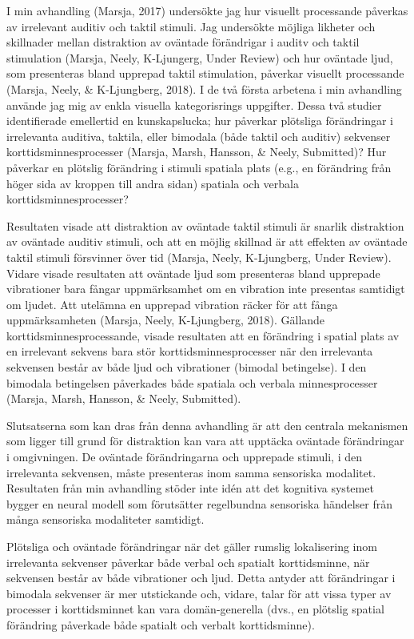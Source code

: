 \documentclass[]{article}
\begin{document}
I min avhandling (Marsja, 2017) undersökte jag hur visuellt processande
påverkas av irrelevant auditiv och taktil stimuli. Jag undersökte
möjliga likheter och skillnader mellan distraktion av oväntade
förändrigar i auditv och taktil stimulation (Marsja, Neely, K-Ljungerg,
Under Review) och hur oväntade ljud, som presenteras bland upprepad
taktil stimulation, påverkar visuellt processande (Marsja, Neely, \&
K-Ljungberg, 2018). I de två första arbetena i min avhandling använde
jag mig av enkla visuella kategorisrings uppgifter. Dessa två studier
identifierade emellertid en kunskapslucka; hur påverkar plötsliga
förändringar i irrelevanta auditiva, taktila, eller bimodala (både
taktil och auditiv) sekvenser korttidsminnesprocesser (Marsja, Marsh,
Hansson, \& Neely, Submitted)? Hur påverkar en plötslig förändring i
stimuli spatiala plats (e.g., en förändring från höger sida av kroppen
till andra sidan) spatiala och verbala korttidsminnesprocesser?

Resultaten visade att distraktion av oväntade taktil stimuli är snarlik
distraktion av oväntade auditiv stimuli, och att en möjlig skillnad är
att effekten av oväntade taktil stimuli försvinner över tid (Marsja,
Neely, K-Ljungberg, Under Review). Vidare visade resultaten att oväntade
ljud som presenteras bland upprepade vibrationer bara fångar
uppmärksamhet om en vibration inte presentas samtidigt om ljudet. Att
utelämna en upprepad vibration räcker för att fånga uppmärksamheten
(Marsja, Neely, K-Ljungberg, 2018). Gällande korttidsminnesprocessande,
visade resultaten att en förändring i spatial plats av en irrelevant
sekvens bara stör korttidsminnesprocesser när den irrelevanta sekvensen
består av både ljud och vibrationer (bimodal betingelse). I den bimodala
betingelsen påverkades både spatiala och verbala minnesprocesser
(Marsja, Marsh, Hansson, \& Neely, Submitted).

Slutsatserna som kan dras från denna avhandling är att den centrala
mekanismen som ligger till grund för distraktion kan vara att upptäcka
oväntade förändringar i omgivningen. De oväntade förändringarna och
upprepade stimuli, i den irrelevanta sekvensen, måste presenteras inom
samma sensoriska modalitet. Resultaten från min avhandling stöder inte
idén att det kognitiva systemet bygger en neural modell som förutsätter
regelbundna sensoriska händelser från många sensoriska modaliteter
samtidigt.

Plötsliga och oväntade förändringar när det gäller rumslig lokalisering
inom irrelevanta sekvenser påverkar både verbal och spatialt
korttidsminne, när sekvensen består av både vibrationer och ljud. Detta
antyder att förändringar i bimodala sekvenser är mer utstickande och,
vidare, talar för att vissa typer av processer i korttidsminnet kan vara
domän-generella (dvs., en plötslig spatial förändring påverkade både
spatialt och verbalt korttidsminne).
\end{document}
